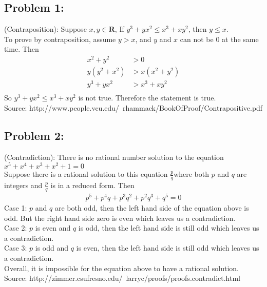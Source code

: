 \documentclass{article}
\begin{document}
 

\hypertarget{}{}
\subsection*{{Problem 1: }}
(Contraposition):  Suppose $x, y \in \mathbf{R}$, If $ y^3+yx^2\leq x^3+xy^2$, then $y\leq x$.  \\
To prove by contraposition, assume $y > x $, and $y$ and $x$ can not be $0$ at the same time. 
Then\begin{align*}
x^2+y^2 &> 0  \\
y(y^2+x^2) &> x(x^2+y^2) \\
 y^3+yx^2 &> x^3+xy^2 \\
\end{align*}
So $y^3+yx^2\leq x^3+xy^2$ is not true. Therefore the statement is true. \\

Source: http://www.people.vcu.edu/~rhammack/BookOfProof/Contrapositive.pdf
\subsection*{{Problem 2: }}
(Contradiction): There is no rational number solution to the equation$ x^5 + x^4 +x^3 +x^2 + 1 = 0 $ \\
Suppose there is a rational solution to this equation $ \frac{p}{q} $where both $p$ and $q$ are integers and  $ \frac{p}{q}  $ is in a reduced form.  Then 
\begin{align*} 
p^5 + p^4q + p^3q^2 + p^2q^3 + q^5 = 0 
\end{align*} 
Case 1: $p$ and $q$ are both odd, then the left hand side of the equation above is odd. But the right hand side zero is even which leaves us a contradiction. \\ 
Case 2: $p$ is even and $q$ is odd, then the left hand side is still odd which leaves us a contradiction. \\
Case 3: $p$ is odd and $q$ is even, then the left hand side is still odd which leaves us a contradiction. \\
Overall, it is impossible for the equation above to have a rational solution. \\
Source:  http://zimmer.csufresno.edu/~larryc/proofs/proofs.contradict.html
\end{document}
